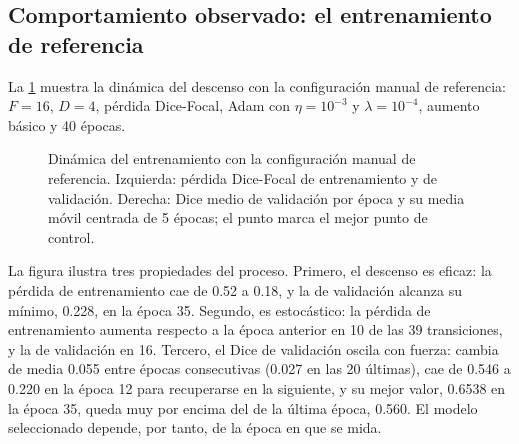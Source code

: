 \subsection{Comportamiento observado: el entrenamiento de referencia}\label{subsec:comportamiento}

La \cref{fig:perdidas} muestra la dinámica del descenso con la configuración manual de referencia: $F=16$, $D=4$, pérdida Dice-Focal, Adam con $\eta=10^{-3}$ y $\lambda=10^{-4}$, aumento básico y 40 épocas.

\begin{figure}[htbp]
  \centering
  \caption{Dinámica del entrenamiento con la configuración manual de referencia. Izquierda: pérdida Dice-Focal de entrenamiento y de validación. Derecha: Dice medio de validación por época y su media móvil centrada de 5 épocas; el punto marca el mejor punto de control.}
  \label{fig:perdidas}
\end{figure}

La figura ilustra tres propiedades del proceso. Primero, el descenso es eficaz: la pérdida de entrenamiento cae de 0.52 a 0.18, y la de validación alcanza su mínimo, 0.228, en la época 35. Segundo, es estocástico: la pérdida de entrenamiento aumenta respecto a la época anterior en 10 de las 39 transiciones, y la de validación en 16. Tercero, el Dice de validación oscila con fuerza: cambia de media 0.055 entre épocas consecutivas (0.027 en las 20 últimas), cae de 0.546 a 0.220 en la época 12 para recuperarse en la siguiente, y su mejor valor, 0.6538 en la época 35, queda muy por encima del de la última época, 0.560. El modelo seleccionado depende, por tanto, de la época en que se mida.

